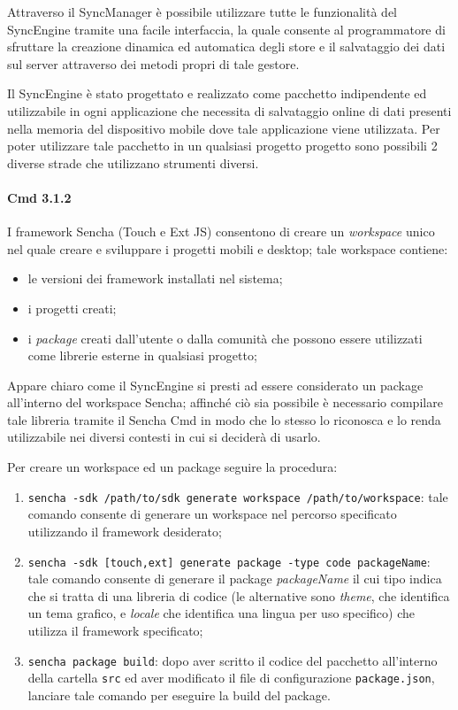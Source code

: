 Attraverso il SyncManager è possibile utilizzare tutte le funzionalità del SyncEngine tramite una facile interfaccia, la quale consente al programmatore di sfruttare la creazione dinamica ed automatica degli store e il salvataggio dei dati sul server attraverso dei metodi propri di tale gestore.

Il SyncEngine è stato progettato e realizzato come pacchetto indipendente ed utilizzabile in ogni applicazione che necessita di salvataggio online di dati presenti nella memoria del dispositivo mobile dove tale applicazione viene utilizzata.
Per poter utilizzare tale pacchetto in un qualsiasi progetto progetto sono possibili 2 diverse strade che utilizzano strumenti diversi.

\paragraph*{Cmd 3.1.2}
I framework Sencha (Touch e Ext JS) consentono di creare un \textit{workspace} unico nel quale creare e sviluppare i progetti mobili e desktop; tale workspace contiene:
	\begin{itemize}
	\item le versioni dei framework installati nel sistema;
	\item i progetti creati;
	\item i \textit{package} creati dall'utente o dalla comunità che possono essere utilizzati come librerie esterne in qualsiasi progetto;
	\end{itemize}
Appare chiaro come il SyncEngine si presti ad essere considerato un package all'interno del workspace Sencha; affinché ciò sia possibile è necessario compilare tale libreria tramite il Sencha Cmd in modo che lo stesso lo riconosca e lo renda utilizzabile nei diversi contesti in cui si deciderà di usarlo.

Per creare un workspace ed un package seguire la procedura:
\begin{enumerate}
\item \texttt{sencha -sdk /path/to/sdk generate workspace /path/to/workspace}: tale comando consente di generare un workspace nel percorso specificato utilizzando il framework desiderato;
\item \texttt{sencha -sdk [touch,ext] generate package -type code packageName}: tale comando consente di generare il package \textit{packageName} il cui tipo indica che si tratta di una libreria di codice (le alternative sono \textit{theme}, che identifica un tema grafico, e \textit{locale} che identifica una lingua per uso specifico) che utilizza il framework specificato;
\item \texttt{sencha package build}: dopo aver scritto il codice del pacchetto all'interno della cartella \texttt{src} ed aver modificato il file di configurazione \texttt{package.json}, lanciare tale comando per eseguire la build del package.
\end{enumerate}

